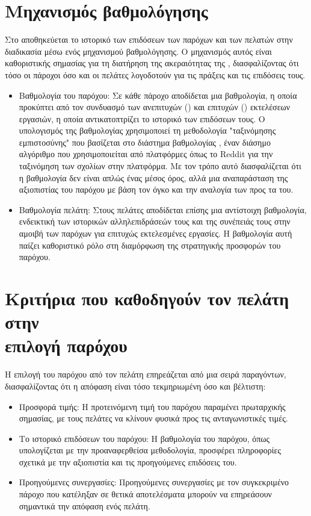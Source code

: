\section{Μηχανισμός βαθμολόγησης}
Στο   αποθηκεύεται το ιστορικό των επιδόσεων των παρόχων και των πελατών στην διαδικασία μέσω ενός μηχανισμού βαθμολόγησης. Ο μηχανισμός αυτός είναι καθοριστικής σημασίας για τη διατήρηση της ακεραιότητας της , διασφαλίζοντας ότι τόσο οι πάροχοι όσο και οι πελάτες λογοδοτούν για τις πράξεις και τις επιδόσεις τους.
\begin{itemize}
    \item Βαθμολογία του παρόχου: Σε κάθε πάροχο αποδίδεται μια βαθμολογία, η οποία προκύπτει από τον συνδυασμό των ανεπιτυχών () και επιτυχών () εκτελέσεων εργασιών, η οποία αντικατοπτρίζει το ιστορικό των επιδόσεων τους. Ο υπολογισμός της βαθμολογίας χρησιμοποιεί τη μεθοδολογία "ταξινόμησης εμπιστοσύνης" που βασίζεται στο διάστημα βαθμολογίας , έναν διάσημο αλγόριθμο που χρησιμοποιείται από πλατφόρμες όπως το Reddit για την ταξινόμηση των σχολίων στην πλατφόρμα. Με τον τρόπο αυτό διασφαλίζεται ότι η βαθμολογία δεν είναι απλώς ένας μέσος όρος, αλλά μια αναπαράσταση της αξιοπιστίας του παρόχου με βάση τον όγκο και την αναλογία των  προς τα  του. 
    \item Βαθμολογία πελάτη: Στους πελάτες αποδίδεται επίσης μια αντίστοιχη βαθμολογία, ενδεικτική των ιστορικών αλληλεπιδράσεών τους και της συνέπειάς τους στην αμοιβή των παρόχων για επιτυχώς εκτελεσμένες εργασίες. Η βαθμολογία αυτή παίζει καθοριστικό ρόλο στη διαμόρφωση της στρατηγικής προσφορών του παρόχου.
\end{itemize}

\section{Κριτήρια που καθοδηγούν τον πελάτη στην \\επιλογή παρόχου}
Η επιλογή του παρόχου από τον πελάτη επηρεάζεται από μια σειρά παραγόντων, διασφαλίζοντας ότι η απόφαση είναι τόσο τεκμηριωμένη όσο και βέλτιστη:
\begin{itemize}
    \item Προσφορά τιμής: Η προτεινόμενη τιμή του παρόχου παραμένει πρωταρχικής σημασίας, με τους πελάτες να κλίνουν φυσικά προς τις ανταγωνιστικές τιμές.
    \item Το ιστορικό επιδόσεων του παρόχου: Η βαθμολογία του παρόχου, όπως υπολογίζεται με την προαναφερθείσα μεθοδολογία, προσφέρει πληροφορίες σχετικά με την αξιοπιστία και τις προηγούμενες επιδόσεις του.
    \item Προηγούμενες συνεργασίες: Προηγούμενες συνεργασίες με τον συγκεκριμένο πάροχο που κατέληξαν σε θετικά αποτελέσματα μπορούν να επηρεάσουν σημαντικά την απόφαση ενός πελάτη.
\end{itemize}

